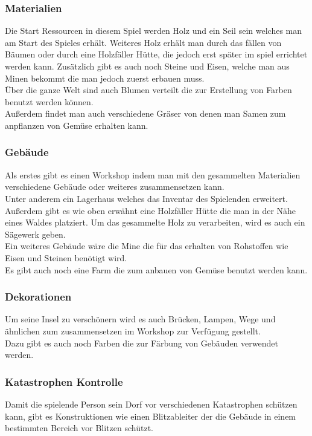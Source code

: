 \documentclass[paper=A4,pagesize=auto,12pt,headinclude=true,footinclude=true,BCOR=0mm,DIV=calc]{scrartcl}
\begin{document}
\subsubsection{Materialien}
Die Start Ressourcen in diesem Spiel werden Holz und ein Seil sein welches man am Start des Spieles erhält. Weiteres Holz erhält man durch das fällen von Bäumen oder durch eine Holzfäller Hütte, die jedoch erst später im spiel errichtet werden kann. Zusätzlich gibt es auch noch Steine und Eisen, welche man aus Minen bekommt die man jedoch zuerst erbauen muss.\\
Über die ganze Welt sind auch Blumen verteilt die zur Erstellung von Farben benutzt werden können.\\
Außerdem findet man auch verschiedene Gräser von denen man Samen zum anpflanzen von Gemüse erhalten kann. 

\subsubsection{Gebäude}
Als erstes gibt es einen Workshop indem man mit den gesammelten Materialien verschiedene Gebäude oder weiteres zusammensetzen kann.\\
Unter anderem ein Lagerhaus welches das Inventar des Spielenden erweitert. Außerdem gibt es wie oben erwähnt eine Holzfäller Hütte die man in der Nähe eines Waldes platziert. Um das gesammelte Holz zu verarbeiten, wird es auch ein Sägewerk geben.\\
Ein weiteres Gebäude wäre die Mine die für das erhalten von Rohstoffen wie Eisen und Steinen benötigt wird.\\
Es gibt auch noch eine Farm die zum anbauen von Gemüse benutzt werden kann.

\subsubsection{Dekorationen}
Um seine Insel zu verschönern wird es auch Brücken, Lampen, Wege und ähnlichen zum zusammensetzen im Workshop zur Verfügung gestellt.\\
Dazu gibt es auch noch Farben die zur Färbung von Gebäuden verwendet werden.

\subsubsection{Katastrophen Kontrolle}
Damit die spielende Person sein Dorf vor verschiedenen Katastrophen schützen kann, gibt es Konstruktionen wie einen Blitzableiter der die Gebäude in einem bestimmten Bereich vor Blitzen schützt.
\end{document}
